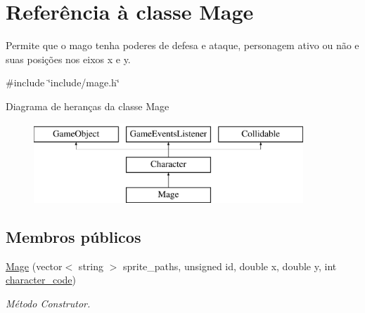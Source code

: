\hypertarget{classMage}{}\section{Referência à classe Mage}
\label{classMage}


Permite que o mago tenha poderes de defesa e ataque, personagem ativo ou não e suas posições nos eixos x e y.  




{\ttfamily \#include \char`\"{}include/mage.\+h\char`\"{}}

Diagrama de heranças da classe Mage\begin{figure}[H]
\begin{center}
\leavevmode
\includegraphics[height=3.000000cm]{classMage}
\end{center}
\end{figure}
\subsection*{Membros públicos}
\begin{DoxyCompactItemize}
\item 
\mbox{\hyperlink{classMage_a691d8def05ca8cbda1a2b9229c52748b}{Mage}} (vector$<$ string $>$ sprite\+\_\+paths, unsigned id, double x, double y, int \mbox{\hyperlink{classCharacter_a3e16e9cb23edc78d774cf30925242a8e}{character\+\_\+code}})
\begin{DoxyCompactList}\small\item\em Método Construtor. \end{DoxyCompactList}\end{DoxyCompactItemize}
